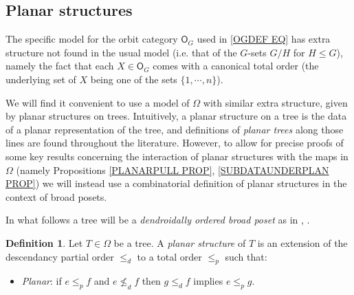 \documentclass[a4paper,10pt
,draft
]{article}%
\numberwithin{equation}{section}
\numberwithin{figure}{section}
\theoremstyle{definition} %
\newtheorem{definition}[equation]{Definition}%
\newcommand{\1}{\ensuremath{\mathbbm 1}}%
\begin{document}
\subsection{Planar structures}\label{PLASTR SEC}



The specific model for the orbit category $\mathsf{O}_G$
used in \eqref{OGDEF EQ} has extra structure not found in the usual model (i.e. that of the $G$-sets $G/H$ for $H \leq G$),
namely the fact that each $X \in \mathsf{O}_G$
comes with a canonical total order 
(the underlying set of $X$ being one of the sets $\{1,\cdots,n\}$).


We will find it convenient to use a model of $\Omega$ with similar extra structure, given by planar structures on trees.
Intuitively, a planar structure on a tree is the data of a planar representation of the tree, and 
definitions of \textit{planar trees} along those lines
are found throughout the literature.
However, to allow for precise proofs of some key results 
concerning the interaction of planar structures with the maps in $\Omega$ 
(namely Propositions \ref{PLANARPULL PROP},  \ref{SUBDATAUNDERPLAN PROP})
we will instead use a combinatorial definition 
of planar structures in the context of broad posets.

In what follows a tree will be a 
\textit{dendroidally ordered broad poset}
as in \cite{We12}, \cite[Def. 5.9]{Pe17}.


\begin{definition}\label{PLANARIZE DEF}
      Let $T \in \Omega$ be a tree. A \textit{planar structure} of $T$ is an extension of the descendancy partial order $\leq_d$ to a total order $\leq_p$ such that:
	\begin{itemize}
		\item \textit{Planar}: if $e \leq_p f$ and $e \nleq_d f$ then 
		$g \leq_d f$ implies $e \leq_p g$.
          \end{itemize}          
\end{definition}
\end{document}
